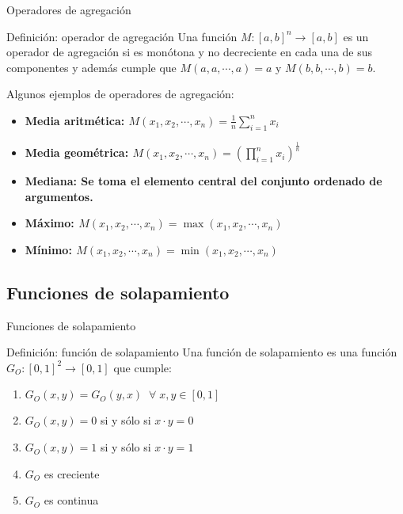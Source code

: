 \documentclass{beamer}
\begin{document}
\begin{frame}{Operadores de agregación}
	\begin{block}{Definición: operador de agregación}
	Una función $M : [a,b]^{n} \rightarrow [a,b]$ es un operador de agregación si es monótona y no decreciente en cada una de sus componentes y además cumple que $M(a, a, \cdots,a) = a$ y $M(b, b, \cdots,b) = b$.
	\end{block}
	Algunos ejemplos de operadores de agregación:
	\begin{itemize}
		\item \bfseries Media aritmética: $M(x_{1},x_{2},\cdots,x_{n}) = \frac{1}{n}\sum\limits_{i=1}^{n}x_{i}$
		\item \bfseries Media geométrica: $M(x_{1},x_{2},\cdots,x_{n}) = (\prod\limits_{i=1}^{n}x_{i})^{\frac{1}{n}}$
		\item \bfseries Mediana: \normalfont Se toma el elemento central del conjunto ordenado de argumentos.
		\item \bfseries Máximo: $M(x_{1},x_{2},\cdots,x_{n}) = \max(x_{1},x_{2},\cdots,x_{n})$
		\item \bfseries Mínimo: $M(x_{1},x_{2},\cdots,x_{n}) = \min(x_{1},x_{2},\cdots,x_{n})$
	\end{itemize}
\end{frame}

\subsection{Funciones de solapamiento}
\begin{frame}{Funciones de solapamiento}
	\begin{block}{Definición: función de solapamiento}
	Una función de solapamiento es una función $G_{O} : [0,1]^{2} \rightarrow [0,1]$ que cumple:
	\begin{enumerate}
	   \item $G_{O}(x,y) = G_{O}(y,x) \;\; \forall \; x,y \in [0,1]$ 
	   \item $G_{O}(x,y) = 0$ si y sólo si $x \cdot y = 0$
	   \item $G_{O}(x,y) = 1$ si y sólo si $x \cdot y = 1$
	   \item $G_{O}$ es creciente
	   \item $G_{O}$ es continua
	\end{enumerate}
	\end{block}
\end{frame}
\end{document}
